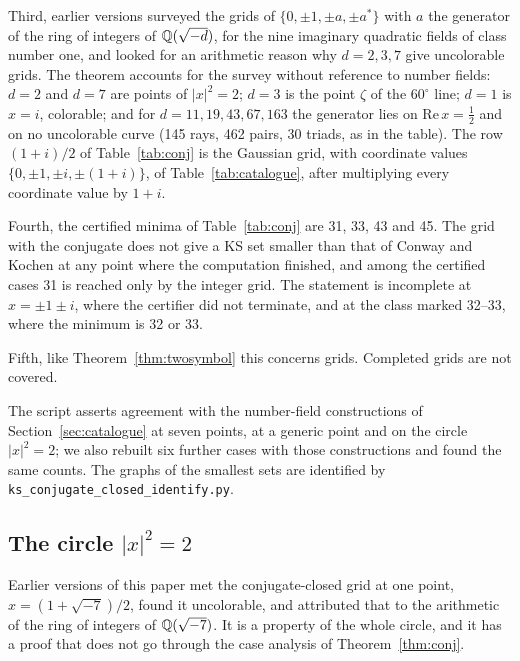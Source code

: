 Third, earlier versions surveyed the grids of $\{0,\pm1,\pm a,\pm a^{*}\}$ with $a$ the
generator of the ring of integers of $\mathbb{Q}(\sqrt{-d})$, for the nine imaginary quadratic fields
of class number one, and looked for an arithmetic reason why $d=2,3,7$ give uncolorable grids.
The theorem accounts for the survey without reference to number fields: $d=2$ and $d=7$ are
points of $|x|^2=2$; $d=3$ is the point $\zeta$ of the $60^\circ$ line; $d=1$ is $x=i$,
colorable; and for $d=11,19,43,67,163$ the generator lies on $\mathrm{Re}\,x=\tfrac12$ and on no
uncolorable curve (145 rays, 462 pairs, 30 triads, as in the table).  The row $(1+i)/2$ of
Table~\ref{tab:conj} is the Gaussian grid, with coordinate values $\{0,\pm1,\pm i,\pm(1+i)\}$, of
Table~\ref{tab:catalogue}, after multiplying every coordinate value by $1+i$.

Fourth, the certified minima of Table~\ref{tab:conj} are 31, 33, 43 and 45.  The grid with
the conjugate does not give a KS set smaller than that of Conway and Kochen at any point where
the computation finished, and among the certified cases 31 is reached only by the integer grid.
The statement is incomplete at $x=\pm1\pm i$, where the certifier did not terminate, and at the
class marked 32--33, where the minimum is 32 or 33.

Fifth, like Theorem~\ref{thm:twosymbol} this concerns grids.  Completed grids are not
covered.

The script asserts agreement with the number-field constructions of
Section~\ref{sec:catalogue} at seven points, at a generic point and on the circle $|x|^2=2$;
we also rebuilt six further cases with those constructions and found the same counts.  The
graphs of the smallest sets are identified by \texttt{ks\_conjugate\_closed\_identify.py}.

\subsection{The circle $|x|^2=2$}\label{sec:circle}

Earlier versions of this paper met the conjugate-closed grid at one point,
$x=(1+\sqrt{-7})/2$, found it uncolorable, and attributed that to the arithmetic of the
ring of integers of $\mathbb{Q}(\sqrt{-7})$.  It is a property of the whole circle, and it has a proof
that does not go through the case analysis of Theorem~\ref{thm:conj}.

